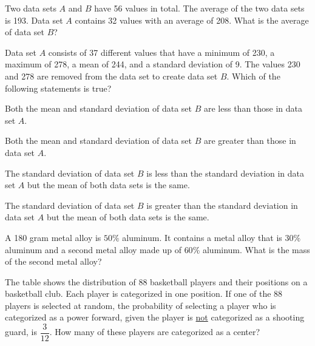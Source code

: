 \vfill
\noindent\begin{minipage}{\linewidth}
\par\smallskip
Two data sets $A$ and $B$ have 56 values in total. The average of the two data sets is 193. Data set $A$ contains 32 values with an average of 208. What is the average of data set $B$?
\end{minipage}
\vfill
\clearpage
\noindent\begin{minipage}{\linewidth}
\par\smallskip
Data set $A$ consists of 37 different values that have a minimum of 230, a maximum of 278, a mean of 244, and a standard deviation of 9. The values 230 and 278 are removed from the data set to create data set $B$. Which of the following statements is true?
\begin{satchoices}
  \item[A)] Both the mean and standard deviation of data set $B$ are less than those in data set $A$.
  \item[B)] Both the mean and standard deviation of data set $B$ are greater than those in data set $A$.
  \item[C)] The standard deviation of data set $B$ is less than the standard deviation in data set $A$ but the mean of both data sets is the same.
  \item[D)] The standard deviation of data set $B$ is greater than the standard deviation in data set $A$ but the mean of both data sets is the same.
\end{satchoices}
\end{minipage}
\vfill
\noindent\begin{minipage}{\linewidth}
\par\smallskip
A 180 gram metal alloy is $50\%$ aluminum. It contains a metal alloy that is $30\%$ aluminum and a second metal alloy made up of $60\%$ aluminum. What is the mass of the second metal alloy?
\end{minipage}
\vfill
\noindent\begin{minipage}{\linewidth}
\par\smallskip
The table shows the distribution of 88 basketball players and their positions on a basketball club. Each player is categorized in one position. If one of the 88 players is selected at random, the probability of selecting a player who is categorized as a power forward, given the player is \underline{not} categorized as a shooting guard, is $\dfrac{3}{12}$. How many of these players are categorized as a center?
\satfig{\figtblbasketball}
\end{minipage}
